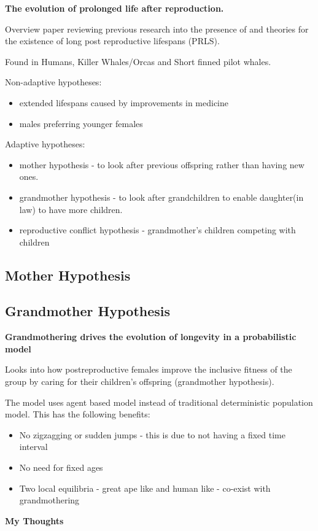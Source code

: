 \documentclass[authoryearcitations]{UoYCSproject}
\begin{document}
\begin{framed}
\noindent \textbf{The evolution of prolonged life after reproduction. \cite{evolutionPRLS2015}}

Overview paper reviewing previous research into the presence of and theories for the existence of long post reproductive lifespans (PRLS).

Found in Humans, Killer Whales/Orcas and Short finned pilot whales.

\noindent Non-adaptive hypotheses:
\begin{itemize}
    \item extended lifespans caused by improvements in medicine
    \item males preferring younger females
\end{itemize}

\noindent Adaptive hypotheses:
\begin{itemize}
    \item mother hypothesis - to look after previous offspring rather than having new ones.
    \item grandmother hypothesis - to look after grandchildren to enable daughter(in law) to have more children.
    \item reproductive conflict hypothesis - grandmother’s children competing with children
\end{itemize}
\end{framed}

\subsection{Mother Hypothesis}
\subsection{Grandmother Hypothesis}
\begin{framed}
\noindent \textbf{Grandmothering drives the evolution of longevity in a probabilistic model \cite{grandmotheringProbabilistic2014}}

Looks into how postreproductive females improve the inclusive fitness of the group by caring for their children's offspring (grandmother hypothesis).

The model uses agent based model instead of traditional deterministic population model. This has the following benefits:
\begin{itemize}
    \item No zigzagging or sudden jumps - this is due to not having a fixed time interval
    \item No need for fixed ages
    \item Two local equilibria - great ape like and human like - co-exist with grandmothering
\end{itemize}

\noindent \textbf{My Thoughts}

\end{framed}
\end{document}
